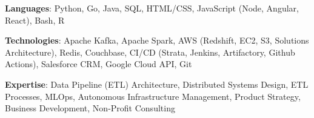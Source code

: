 

\begin{cvparagraph}
\textbf{Languages}: Python, Go, Java, SQL, HTML/CSS, JavaScript (Node, Angular, React), Bash, R

\textbf{Technologies}: Apache Kafka, Apache Spark, AWS (Redshift, EC2, S3, Solutions Architecture), Redis, Couchbase, CI/CD (Strata, Jenkins, Artifactory, Github Actions), Salesforce CRM, Google Cloud API, Git

\textbf{Expertise}: Data Pipeline (ETL) Architecture, Distributed Systems Design, ETL Processes, MLOps, Autonomous Infrastructure Management, Product Strategy, Business Development, Non-Profit Consulting


\end{cvparagraph}
